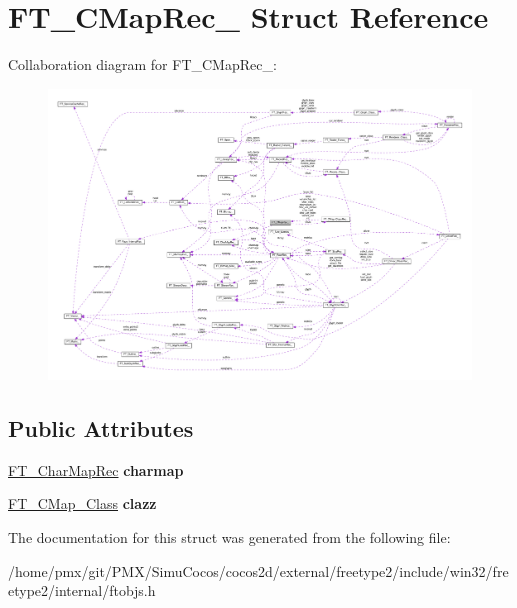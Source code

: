 \hypertarget{structFT__CMapRec__}{}\section{F\+T\+\_\+\+C\+Map\+Rec\+\_\+ Struct Reference}
\label{structFT__CMapRec__}


Collaboration diagram for F\+T\+\_\+\+C\+Map\+Rec\+\_\+\+:
\nopagebreak
\begin{figure}[H]
\begin{center}
\leavevmode
\includegraphics[width=350pt]{structFT__CMapRec____coll__graph}
\end{center}
\end{figure}
\subsection*{Public Attributes}
\begin{DoxyCompactItemize}
\item 
\mbox{\label{structFT__CMapRec___a39fa6de9995d4ae4496b93e2b874b34e}} 
\hyperlink{structFT__CharMapRec__}{F\+T\+\_\+\+Char\+Map\+Rec} {\bfseries charmap}
\item 
\mbox{\label{structFT__CMapRec___aa85db42650df0edb38f8af5887c0ac6a}} 
\hyperlink{structFT__CMap__ClassRec__}{F\+T\+\_\+\+C\+Map\+\_\+\+Class} {\bfseries clazz}
\end{DoxyCompactItemize}


The documentation for this struct was generated from the following file\+:\begin{DoxyCompactItemize}
\item 
/home/pmx/git/\+P\+M\+X/\+Simu\+Cocos/cocos2d/external/freetype2/include/win32/freetype2/internal/ftobjs.\+h\end{DoxyCompactItemize}
